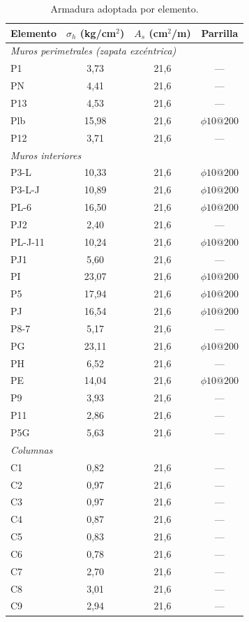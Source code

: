 \begin{table}[H]
\centering
\footnotesize
\caption{Armadura adoptada por elemento.}
\label{tab:arm}
\begin{tabular}{lccc}
\hline
Elemento & $\sigma_h$ (kg/cm$^2$) & $A_s$ (cm$^2$/m) & Parrilla \\
\hline
\multicolumn{4}{l}{\textit{Muros perimetrales (zapata excéntrica)}} \\
\hline
P1  & 3,73  & 21,6 & --- \\
PN  & 4,41  & 21,6 & --- \\
P13 & 4,53  & 21,6 & --- \\
Plb & 15,98 & 21,6 & $\phi 10 @ 200$ \\
P12 & 3,71  & 21,6 & --- \\
\hline
\multicolumn{4}{l}{\textit{Muros interiores}} \\
\hline
P3-L    & 10,33 & 21,6 & $\phi 10 @ 200$ \\
P3-L-J  & 10,89 & 21,6 & $\phi 10 @ 200$ \\
PL-6    & 16,50 & 21,6 & $\phi 10 @ 200$ \\
PJ2     & 2,40  & 21,6 & --- \\
PL-J-11 & 10,24 & 21,6 & $\phi 10 @ 200$ \\
PJ1     & 5,60  & 21,6 & --- \\
PI      & 23,07 & 21,6 & $\phi 10 @ 200$ \\
P5      & 17,94 & 21,6 & $\phi 10 @ 200$ \\
PJ      & 16,54 & 21,6 & $\phi 10 @ 200$ \\
P8-7    & 5,17  & 21,6 & --- \\
PG      & 23,11 & 21,6 & $\phi 10 @ 200$ \\
PH      & 6,52  & 21,6 & --- \\
PE      & 14,04 & 21,6 & $\phi 10 @ 200$ \\
P9      & 3,93  & 21,6 & --- \\
P11     & 2,86  & 21,6 & --- \\
P5G     & 5,63  & 21,6 & --- \\
\hline
\multicolumn{4}{l}{\textit{Columnas}} \\
\hline
C1 & 0,82 & 21,6 & --- \\
C2 & 0,97 & 21,6 & --- \\
C3 & 0,97 & 21,6 & --- \\
C4 & 0,87 & 21,6 & --- \\
C5 & 0,83 & 21,6 & --- \\
C6 & 0,78 & 21,6 & --- \\
C7 & 2,70 & 21,6 & --- \\
C8 & 3,01 & 21,6 & --- \\
C9 & 2,94 & 21,6 & --- \\
\hline
\end{tabular}
\end{table}